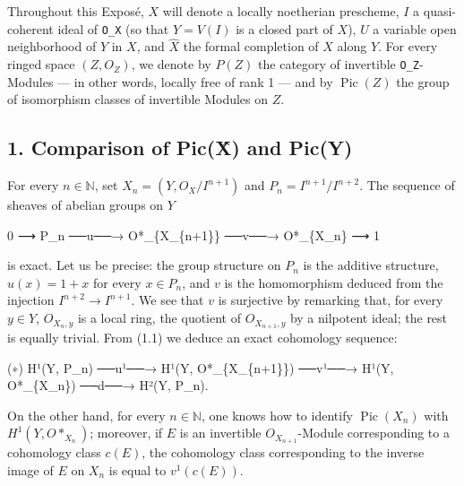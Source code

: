\documentclass[
]{article}
\newenvironment{Shaded}{}{}
\newcommand{\NormalTok}[1]{#1}
\begin{document}
Throughout this Exposé, \(X\) will denote a locally noetherian
prescheme, \(I\) a quasi-coherent ideal of \texttt{O\_X} (so that
\(Y = V(I)\) is a closed part of \(X\)), \(U\) a variable open
neighborhood of \(Y\) in \(X\), and \(\hat{X}\) the formal completion of
\(X\) along \(Y\). For every ringed space \((Z, O_{Z})\), we denote by
\(P(Z)\) the category of invertible \texttt{O\_Z}-Modules --- in other
words, locally free of rank 1 --- and by \(\operatorname{Pic}(Z)\) the
group of isomorphism classes of invertible Modules on \(Z\).

\subsection{1. Comparison of Pic(X̂) and
Pic(Y)}\label{comparison-of-picx-and-picy}

For every \(n \in \mathbb{N}\), set \(X_{n} = (Y, O_{X}/I^{n+1})\) and
\(P_{n} = I^{n+1}/I^{n+2}\). The sequence of sheaves of abelian groups
on \(Y\)

\begin{Shaded}
\begin{Highlighting}[]
\NormalTok{0 ⟶ P\_n ──u──→ O*\_\{X\_\{n+1\}\} ──v──→ O*\_\{X\_n\} ⟶ 1}
\end{Highlighting}
\end{Shaded}

is exact. Let us be precise: the group structure on \(P_{n}\) is the
additive structure, \(u(x) = 1 + x\) for every \(x \in P_{n}\), and
\(v\) is the homomorphism deduced from the injection
\(I^{n+2} \to I^{n+1}\). We see that \(v\) is surjective by remarking
that, for every \(y \in Y\), \(O_{X_{n}, y}\) is a local ring, the
quotient of \(O_{X_{n+1}, y}\) by a nilpotent ideal; the rest is equally
trivial. From (1.1) we deduce an exact cohomology sequence:

\begin{Shaded}
\begin{Highlighting}[]
\NormalTok{(∗)   H¹(Y, P\_n) ──u¹──→ H¹(Y, O*\_\{X\_\{n+1\}\}) ──v¹──→ H¹(Y, O*\_\{X\_n\}) ──d──→ H²(Y, P\_n).}
\end{Highlighting}
\end{Shaded}

On the other hand, for every \(n \in \mathbb{N}\), one knows how to
identify \(\operatorname{Pic}(X_{n})\) with \(H^{1}(Y, O*_{X_{n}})\);
moreover, if \(E\) is an invertible \(O_{X_{n+1}}\)-Module corresponding
to a cohomology class \(c(E)\), the cohomology class corresponding to
the inverse image of \(E\) on \(X_{n}\) is equal to \(v^{1}(c(E))\).
\end{document}
